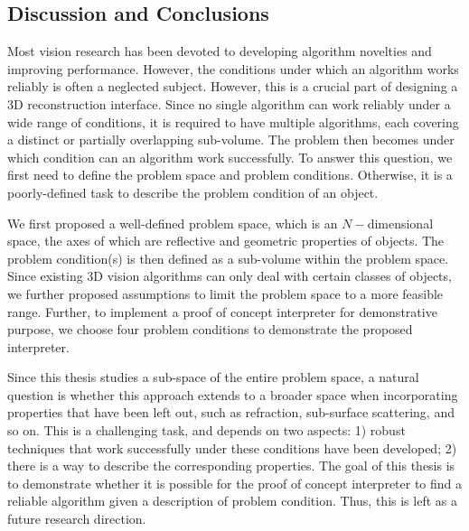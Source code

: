 \subsection{Discussion and Conclusions}
Most vision research has been devoted to developing algorithm novelties and improving performance. However, the conditions under which an algorithm works reliably is often a neglected subject. However, this is a crucial part of designing a 3D reconstruction interface. Since no single algorithm can work reliably under a wide range of conditions, it is required to have multiple algorithms, each covering a distinct or partially overlapping sub-volume. The problem then becomes under which condition can an algorithm work successfully. To answer this question, we first need to define the problem space and problem conditions. Otherwise, it is a poorly-defined task to describe the problem condition of an object.

We first proposed a well-defined problem space, which is an $N-$dimensional space, the axes of which are reflective and geometric properties of objects. The problem condition(s) is then defined as a sub-volume within the problem space. Since existing 3D vision algorithms can only deal with certain classes of objects, we further proposed assumptions to limit the problem space to a more feasible range. Further, to implement a proof of concept interpreter for demonstrative purpose, we choose four problem conditions to demonstrate the proposed interpreter.

Since this thesis studies a sub-space of the entire problem space, a natural question is whether this approach extends to a broader space when incorporating properties that have been left out, such as refraction, sub-surface scattering, and so on. This is a challenging task, and depends on two aspects: 1) robust techniques that work successfully under these conditions have been developed; 2) there is a way to describe the corresponding properties. The goal of this thesis is to demonstrate whether it is possible for the proof of concept interpreter to find a reliable algorithm given a description of problem condition. Thus, this is left as a future research direction.
